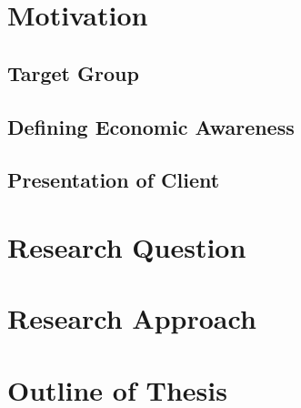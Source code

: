 \section{Motivation}
\subsection{Target Group}
\subsection{Defining Economic Awareness}
\subsection{Presentation of Client}
\section{Research Question}
\section{Research Approach}
\section{Outline of Thesis}
